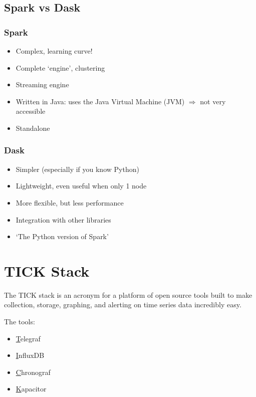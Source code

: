 \documentclass{article}
\begin{document}
\subsection{Spark vs Dask}
\subsubsection{Spark}

\begin{itemize}
    \item Complex, learning curve!
    \item Complete `engine', clustering
    \item Streaming engine
    \item Written in Java: uses the Java Virtual Machine (JVM) $\Rightarrow$ not very accessible
    \item Standalone
\end{itemize}

\subsubsection{Dask}

\begin{itemize}
    \item Simpler (especially if you know Python)
    \item Lightweight, even useful when only  1 node
    \item More flexible, but less performance
    \item Integration with other libraries
    \item `The Python version of Spark'
\end{itemize}

\section{TICK Stack}

The TICK stack is an acronym for a platform of open source tools 
built to make collection, storage, graphing, and alerting on 
time series data incredibly easy.

The tools:

\begin{itemize}
    \item \underline{T}elegraf
    \item \underline{I}nfluxDB
    \item \underline{C}hronograf
    \item \underline{K}apacitor
\end{itemize}
\end{document}
